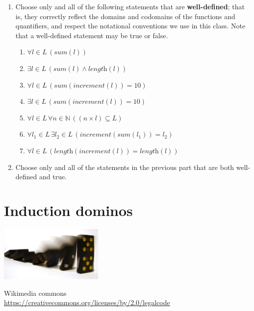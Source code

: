 \documentclass[12pt, oneside]{article}
\begin{document}
\begin{enumerate}
    \newpage
    \item Choose only and all of the following statements that are \textbf{well-defined}; that is, they correctly reflect the domains and codomains of the functions and quantifiers, and respect the notational conventions we use in this class. Note that a well-defined statement may be true or false.

    \begin{multicols}{2}    
    \begin{enumerate}
        \item $\forall l \in L \, (\textit{sum}(l))$
        \item $\exists l \in L \, (\textit{sum}(l) \land \textit{length}(l))$
        \item $\forall l \in L \, (\textit{sum}(\textit{increment}(l)) = 10)$
        \item $\exists l \in L \, (\textit{sum}(\textit{increment}(l)) = 10)$
        \item $\forall l \in L \, \forall n \in \mathbb{N} \, ((n \times l) \subseteq L)$
        \item $\forall l_1 \in L \, \exists l_2 \in L \, (\textit{increment}(\textit{sum}(l_1)) = l_2)$
        \item $\forall l \in L \, (\textit{length}(\textit{increment}(l)) = \textit{length}(l))$
    \end{enumerate}
    \end{multicols}
    
    \item Choose only and all of the statements in the previous part that are both well-defined and true.
\end{enumerate} \vfill
\section*{Induction dominos}


\begin{center}
    \includegraphics[width=2in]{../../resources/images/Domino_Cascade.jpeg}

    {\tiny Wikimedia commons\\ \href{https://creativecommons.org/licenses/by/2.0/legalcode}{https://creativecommons.org/licenses/by/2.0/legalcode} }
\end{center} \vfill
\end{document}
